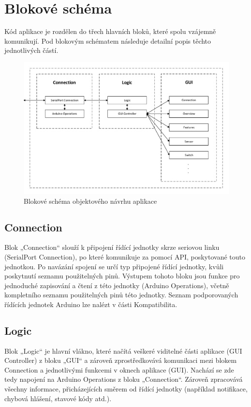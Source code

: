 \documentclass[FM,DP]{tulthesis}  %
\begin{document}
\section{Blokové schéma}
Kód aplikace je rozdělen do třech hlavních bloků, které spolu vzájemně komunikují. Pod blokovým schématem následuje detailní popis těchto jednotlivých částí.

\begin{figure}[H]
\begin{center}
\includegraphics[width=\textwidth]{vector/blokoveSchemaSecurityControl.pdf}
\caption{Blokové schéma objektového návrhu aplikace}
\label{image}
\end{center}
\end{figure}

\subsection{Connection}
Blok „Connection“ slouží k připojení řídící jednotky skrze seriovou linku (SerialPort Connection), po které komunikuje za pomocí API, poskytované touto jednotkou. Po navázání spojení se určí typ připojené řídící jednotky, kvůli poskytnutí seznamu použitelných pinů. Výstupem tohoto bloku jsou funkce pro jednoduché zapisování a čtení z této jednotky (Arduino Operations), včetně kompletního seznamu použitelných pinů této jednotky. Seznam podporovaných řídících jednotek Arduino lze nalézt v části Kompatibilita.

\subsection{Logic}
Blok „Logic“ je hlavní vlákno, které načítá veškeré viditelné části aplikace (GUI Controller) z bloku „GUI“ a zároveň zprostředkovává komunikaci mezi blokem Connection a jednotlivými funkcemi v oknech aplikace (GUI). Nachází se zde tedy napojení na Arduino Operations z bloku „Connection“. Zároveň zpracovává všechny informace, přicházejících směrem od řídící jednotky (například notifikace, chybová hlášení, stavové kódy atd.).
\end{document}
